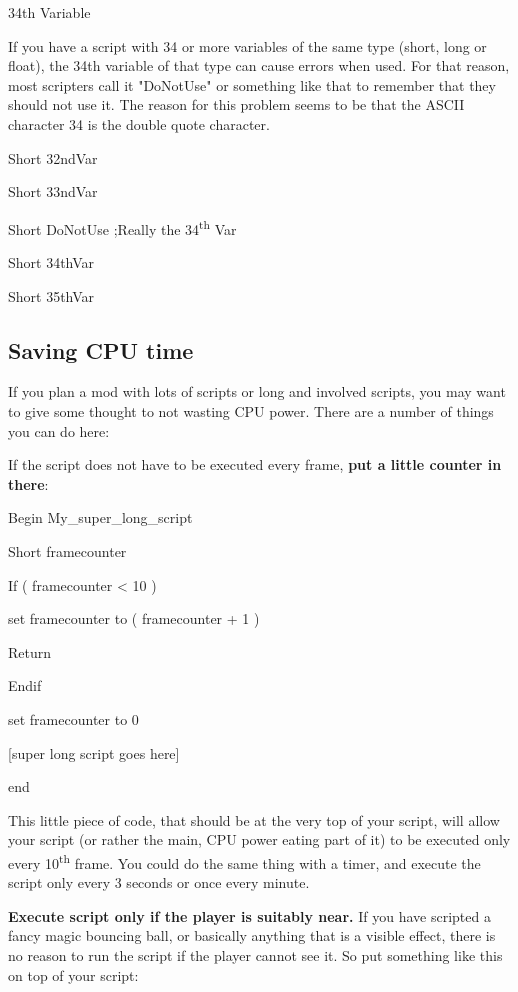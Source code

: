 \documentclass[
]{article}
\begin{document}
34th Variable

If you have a script with 34 or more variables of the same type (short,
long or float), the 34th variable of that type can cause errors when
used. For that reason, most scripters call it "DoNotUse" or something
like that to remember that they should not use it. The reason for this
problem seems to be that the ASCII character 34 is the double quote
character.

Short 32ndVar

Short 33ndVar

Short DoNotUse ;Really the 34\textsuperscript{th} Var

Short 34thVar

Short 35thVar

\hypertarget{saving-cpu-time}{%
\subsection{\texorpdfstring{\hfill\break
Saving CPU time}{ Saving CPU time}}\label{saving-cpu-time}}

If you plan a mod with lots of scripts or long and involved scripts, you
may want to give some thought to not wasting CPU power. There are a
number of things you can do here:

If the script does not have to be executed every frame, \textbf{put a
little counter in there}:

Begin My\_super\_long\_script

Short framecounter

If ( framecounter \textless{} 10 )

set framecounter to ( framecounter + 1 )

Return

Endif

set framecounter to 0

{[}super long script goes here{]}

end

This little piece of code, that should be at the very top of your
script, will allow your script (or rather the main, CPU power eating
part of it) to be executed only every 10\textsuperscript{th} frame. You
could do the same thing with a timer, and execute the script only every
3 seconds or once every minute.

\textbf{Execute script only if the player is suitably near.} If you have
scripted a fancy magic bouncing ball, or basically anything that is a
visible effect, there is no reason to run the script if the player
cannot see it. So put something like this on top of your script:
\end{document}
